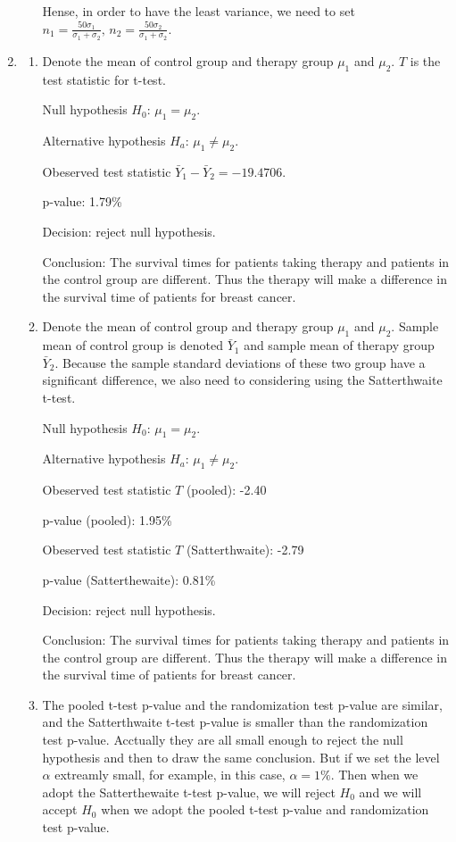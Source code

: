\documentclass{article}
\begin{document}
\begin{enumerate}[leftmargin = 0 em, label = \arabic*., font = \bfseries]
\begin{enumerate}
Hense, in order to have the least variance, we need to set $n_1 = \frac{50 \sigma_1}{\sigma_1 + \sigma_2},\, n_2 = \frac{50 \sigma_2}{\sigma_1 + \sigma_2}$.

	\end{enumerate}
\newpage
	\item
	\begin{enumerate}
		\item 
	Denote the mean of control group and therapy group $\mu_1$ and $\mu_2$. $T$ is the test statistic for t-test.

	Null hypothesis $H_0$: $\mu_1 = \mu_2$.

	Alternative hypothesis $H_a$: $\mu_1 \neq \mu_2$.

	Obeserved test statistic $\bar{Y}_1 - \bar{Y}_2 = -19.4706$.

	p-value: 1.79\%

	Decision: reject null hypothesis.

	Conclusion: The survival times for patients taking therapy and patients in the control group are different. Thus the therapy will make a difference in the survival time of patients for breast cancer.
	

	
	\item 
	Denote the mean of control group and therapy group $\mu_1$ and $\mu_2$. Sample mean of control group is denoted $\bar{Y}_1$ and sample mean of therapy group $\bar{Y}_2$. Because the sample standard deviations of these two group have a significant difference, we also need to considering using the Satterthwaite t-test. 

	Null hypothesis $H_0$: $\mu_1 = \mu_2$.

	Alternative hypothesis $H_a$: $\mu_1 \neq \mu_2$.

	Obeserved test statistic $T$ (pooled): -2.40

	p-value (pooled): 1.95\%

	Obeserved test statistic $T$ (Satterthwaite): -2.79

	p-value (Satterthewaite): 0.81\%

	Decision: reject null hypothesis.

	Conclusion: The survival times for patients taking therapy and patients in the control group are different. Thus the therapy will make a difference in the survival time of patients for breast cancer.

	\item The pooled t-test p-value and the randomization test p-value are similar, and the Satterthwaite t-test p-value is smaller than the randomization test p-value. Acctually they are all small enough to reject the null hypothesis and then to draw the same conclusion. But if we set the level $\alpha$ extreamly small, for example, in this case, $\alpha = 1\%$. Then when we adopt the Satterthewaite t-test p-value, we will reject $H_0$ and we will accept $H_0$ when we adopt the pooled t-test p-value and randomization test p-value.


\end{enumerate}
\end{enumerate}
\end{document}
